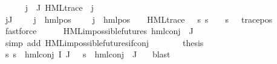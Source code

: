 \begin{isabellebody}
\ \ \ \ \isamarkupfalse%
\ {\isachardoublequoteopen}{\isasymforall}j\ {\isasymin}\ J{\isachardot}{\kern0pt}\ HML{\isacharunderscore}{\kern0pt}trace\ {\isacharparenleft}{\kern0pt}{\isasymPsi}\ j{\isacharparenright}{\kern0pt}{\isachardoublequoteclose}\ \isanewline
\ \ \ \ \ \ \isamarkupfalse%
\ {\isacartoucheopen}{\isasymforall}j{\isasymin}J{\isachardot}{\kern0pt}\ {\isasymexists}{\isasymalpha}\ {\isasympsi}\ {\isasymphi}{\isachardot}{\kern0pt}\ {\isasymPsi}\ j\ {\isacharequal}{\kern0pt}\ hml{\isacharunderscore}{\kern0pt}pos\ {\isasymalpha}\ {\isasympsi}\ {\isasymand}\ {\isasymPhi}\ j\ {\isacharequal}{\kern0pt}\ hml{\isacharunderscore}{\kern0pt}pos\ {\isasymalpha}\ {\isasymphi}\ {\isasymand}\ HML{\isacharunderscore}{\kern0pt}trace\ {\isasympsi}\ {\isasymand}\ {\isacharparenleft}{\kern0pt}{\isasymforall}s{\isachardot}{\kern0pt}\ {\isacharparenleft}{\kern0pt}s\ {\isasymTurnstile}\ {\isasymphi}{\isacharparenright}{\kern0pt}\ {\isacharequal}{\kern0pt}\ {\isacharparenleft}{\kern0pt}s\ {\isasymTurnstile}\ {\isasympsi}{\isacharparenright}{\kern0pt}{\isacharparenright}{\kern0pt}{\isacartoucheclose}\ trace{\isacharunderscore}{\kern0pt}pos\ \isamarkupfalse%
\ fastforce\isanewline
\ \ \ \ \isamarkupfalse%
\ {\isachardoublequoteopen}HML{\isacharunderscore}{\kern0pt}impossible{\isacharunderscore}{\kern0pt}futures\ {\isacharparenleft}{\kern0pt}hml{\isacharunderscore}{\kern0pt}conj\ {\isacharbraceleft}{\kern0pt}{\isacharbraceright}{\kern0pt}\ J\ {\isasymPsi}{\isacharparenright}{\kern0pt}{\isachardoublequoteclose}\isanewline
\ \ \ \ \ \ \isamarkupfalse%
\ {\isacharparenleft}{\kern0pt}simp\ add{\isacharcolon}{\kern0pt}\ HML{\isacharunderscore}{\kern0pt}impossible{\isacharunderscore}{\kern0pt}futures{\isachardot}{\kern0pt}if{\isacharunderscore}{\kern0pt}conj{\isacharparenright}{\kern0pt}\isanewline
\ \ \ \ \isamarkupfalse%
\ \isamarkupfalse%
\ {\isacharquery}{\kern0pt}thesis\ \isanewline
\ \ \ \ \ \ \isamarkupfalse%
\ {\isacartoucheopen}{\isasymforall}s{\isachardot}{\kern0pt}\ {\isacharparenleft}{\kern0pt}s\ {\isasymTurnstile}\ hml{\isacharunderscore}{\kern0pt}conj\ I\ J\ {\isasymPhi}{\isacharparenright}{\kern0pt}\ {\isacharequal}{\kern0pt}\ {\isacharparenleft}{\kern0pt}s\ {\isasymTurnstile}\ hml{\isacharunderscore}{\kern0pt}conj\ {\isacharbraceleft}{\kern0pt}{\isacharbraceright}{\kern0pt}\ J\ {\isasymPsi}{\isacharparenright}{\kern0pt}{\isacartoucheclose}\ \isamarkupfalse%
\ blast\isanewline
\ \ \isamarkupfalse%

\end{isabellebody}
